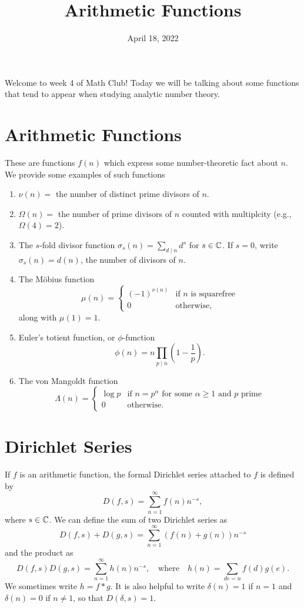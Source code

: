 \documentclass{article}
\title{Arithmetic Functions}
\author{}
\date{April 18, 2022}
\begin{document}
Welcome to week 4 of Math Club!
Today we will be talking about some functions that tend to appear when studying analytic number theory.

\section{Arithmetic Functions}

These are functions \(f(n)\) which express some number-theoretic fact about \(n\).
We provide some examples of such functions
\begin{enumerate}
    \item \(\nu(n) =\) the number of distinct prime divisors of \(n\).
    \item \(\Omega(n) =\) the number of prime divisors of \(n\) counted with multiplcity (e.g., \(\Omega(4)=2\)).
    \item The \(s\)-fold divisor function \(\sigma_s(n) = \sum_{d\mid n}d^s\) for \(s\in\mathbb{C}\). If \(s=0\), write \(\sigma_s(n)=d(n)\), the number of divisors of \(n\).
    \item The M\"obius function 
    \[\mu(n) = \begin{cases}
        (-1)^{\nu(n)} & \textrm{if }n\textrm{ is squarefree}\\
        0 & \textrm{otherwise,}
    \end{cases}\]
    along with \(\mu(1)=1\).
    \item Euler's totient function, or \(\phi\)-function
    \[\phi(n) = n\prod_{p\mid n}\left(1-\frac{1}{p}\right).\]
    \item The von Mangoldt function
    \[\Lambda(n) = \begin{cases}
        \log p & \textrm{if }n=p^\alpha\textrm{ for some }\alpha\geq 1\textrm{ and }p\textrm{ prime}\\
        0 & \textrm{otherwise.}
    \end{cases}\]
\end{enumerate}

\section{Dirichlet Series}

If \(f\) is an arithmetic function, the formal Dirichlet series attached to \(f\) is defined by
\[D(f,s) = \sum_{n=1}^\infty f(n)n^{-s},\]
where \(s\in\mathbb{C}\).
We can define the sum of two Dirichlet series as
\[D(f,s) + D(g,s) = \sum_{n=1}^\infty\left(f(n)+g(n)\right)n^{-s}\]
and the product as
\[D(f,s)D(g,s) = \sum_{n=1}^\infty h(n)n^{-s},\quad\textrm{where}\quad h(n) = \sum_{de=n}f(d)g(e).\]
We sometimes write \(h=f*g\).
It is also helpful to write \(\delta(n)=1\) if \(n=1\) and \(\delta(n)=0\) if \(n\neq 1\), so that \(D(\delta,s)=1\).
\end{document}
